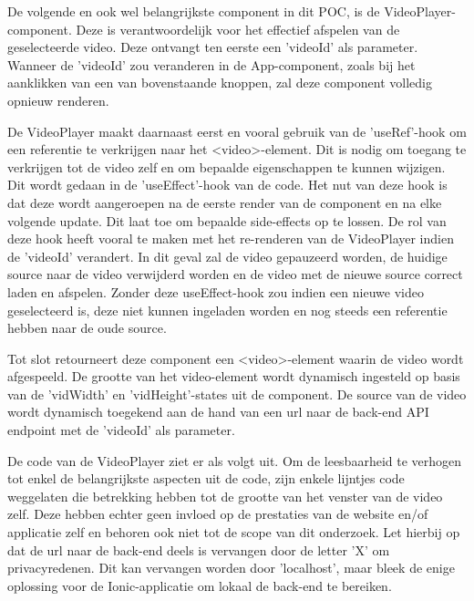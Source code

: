 De volgende en ook wel belangrijkste component in dit POC, is de VideoPlayer-component. Deze is verantwoordelijk voor het effectief afspelen van de geselecteerde video. Deze ontvangt ten eerste een 'videoId' als parameter. Wanneer de 'videoId' zou veranderen in de App-component, zoals bij het aanklikken van een van bovenstaande knoppen, zal deze component volledig opnieuw renderen.

De VideoPlayer maakt daarnaast eerst en vooral gebruik van de 'useRef'-hook om een referentie te verkrijgen naar het <video>-element. Dit is nodig om toegang te verkrijgen tot de video zelf en om bepaalde eigenschappen te kunnen wijzigen. Dit wordt gedaan in de 'useEffect'-hook van de code. Het nut van deze hook is dat deze wordt aangeroepen na de eerste render van de component en na elke volgende update. Dit laat toe om bepaalde side-effects op te lossen. De rol van deze hook heeft vooral te maken met het re-renderen van de VideoPlayer indien de 'videoId' verandert. In dit geval zal de video gepauzeerd worden, de huidige source naar de video verwijderd worden en de video met de nieuwe source correct laden en afspelen. Zonder deze useEffect-hook zou indien een nieuwe video geselecteerd is, deze niet kunnen ingeladen worden en nog steeds een referentie hebben naar de oude source.

Tot slot retourneert deze component een <video>-element waarin de video wordt afgespeeld. De grootte van het video-element wordt dynamisch ingesteld op basis van de 'vidWidth' en 'vidHeight'-states uit de component. De source van de video wordt dynamisch toegekend aan de hand van een url naar de back-end API endpoint met de 'videoId' als parameter.

De code van de VideoPlayer ziet er als volgt uit. Om de leesbaarheid te verhogen tot enkel de belangrijkste aspecten uit de code, zijn enkele lijntjes code weggelaten die betrekking hebben tot de grootte van het venster van de video zelf. Deze hebben echter geen invloed op de prestaties van de website en/of applicatie zelf en behoren ook niet tot de scope van dit onderzoek. Let hierbij op dat de url naar de back-end deels is vervangen door de letter 'X' om privacyredenen. Dit kan vervangen worden door 'localhost', maar bleek de enige oplossing voor de Ionic-applicatie om lokaal de back-end te bereiken.

